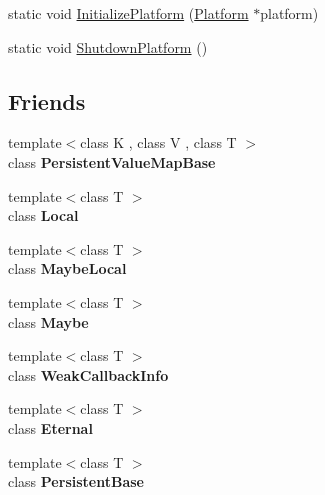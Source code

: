 \begin{DoxyCompactItemize}
\item 
static void \hyperlink{classv8_1_1V8_a095eb8064458588a579c2b904e02dbbf}{Initialize\+Platform} (\hyperlink{classv8_1_1Platform}{Platform} $\ast$platform)
\item 
static void \hyperlink{classv8_1_1V8_a228fad83cc2fe17f10cea1a6fb6669c7}{Shutdown\+Platform} ()
\end{DoxyCompactItemize}
\subsection*{Friends}
\begin{DoxyCompactItemize}
\item 
{\footnotesize template$<$class K , class V , class T $>$ }\\class {\bfseries Persistent\+Value\+Map\+Base}\hypertarget{classv8_1_1V8_a08e2b8f164392d71811ce6cc134f33e3}{}\label{classv8_1_1V8_a08e2b8f164392d71811ce6cc134f33e3}

\item 
{\footnotesize template$<$class T $>$ }\\class {\bfseries Local}\hypertarget{classv8_1_1V8_afb872edb4aac7ba55f0da004113aa2b0}{}\label{classv8_1_1V8_afb872edb4aac7ba55f0da004113aa2b0}

\item 
{\footnotesize template$<$class T $>$ }\\class {\bfseries Maybe\+Local}\hypertarget{classv8_1_1V8_a8c1dab86fc095fca89075da411a82209}{}\label{classv8_1_1V8_a8c1dab86fc095fca89075da411a82209}

\item 
{\footnotesize template$<$class T $>$ }\\class {\bfseries Maybe}\hypertarget{classv8_1_1V8_ae606ba8c3656041ee7ec7532d02a3bdb}{}\label{classv8_1_1V8_ae606ba8c3656041ee7ec7532d02a3bdb}

\item 
{\footnotesize template$<$class T $>$ }\\class {\bfseries Weak\+Callback\+Info}\hypertarget{classv8_1_1V8_aeeef5ad4ce5906cf147f93645284ebdf}{}\label{classv8_1_1V8_aeeef5ad4ce5906cf147f93645284ebdf}

\item 
{\footnotesize template$<$class T $>$ }\\class {\bfseries Eternal}\hypertarget{classv8_1_1V8_adf5d8780aceb9310fb1246aae7ec348e}{}\label{classv8_1_1V8_adf5d8780aceb9310fb1246aae7ec348e}

\item 
{\footnotesize template$<$class T $>$ }\\class {\bfseries Persistent\+Base}\hypertarget{classv8_1_1V8_abb172e0bb22fc5fed7a3a66f29d046ce}{}\label{classv8_1_1V8_abb172e0bb22fc5fed7a3a66f29d046ce}


\end{DoxyCompactItemize}
